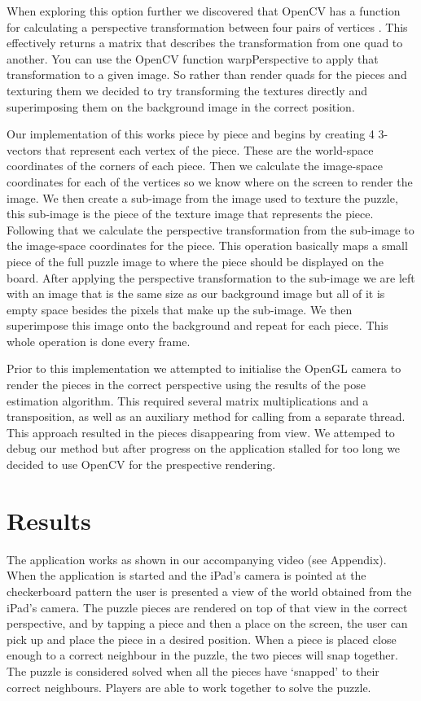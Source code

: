 \documentclass{article}
\begin{document}
When exploring this option further we discovered that OpenCV has a function for calculating a perspective transformation between four pairs of vertices \cite{cv_render}. This effectively returns a matrix that describes the transformation from one quad to another. You can use the OpenCV function warpPerspective to apply that transformation to a given image. So rather than render quads for the pieces and texturing them we decided to try transforming the textures directly and superimposing them on the background image in the correct position. 

Our implementation of this works piece by piece and begins by creating 4 3-vectors that represent each vertex of the piece. These are the world-space coordinates of the corners of each piece. Then we calculate the image-space coordinates for each of the vertices so we know where on the screen to render the image. We then create a sub-image from the image used to texture the puzzle, this sub-image is the piece of the texture image that represents the piece. Following that we calculate the perspective transformation from the sub-image to the image-space coordinates for the piece. This operation basically maps a small piece of the full puzzle image to where the piece should be displayed on the board. After applying the perspective transformation to the sub-image we are left with an image that is the same size as our background image but all of it is empty space besides the pixels that make up the sub-image. We then superimpose this image onto the background and repeat for each piece. This whole operation is done every frame. 

Prior to this implementation we attempted to initialise the OpenGL camera to render the pieces in the correct perspective using the results of the pose estimation algorithm. This required several matrix multiplications and a transposition, as well as an auxiliary method for calling from a separate thread. This approach resulted in the pieces disappearing from view. We attemped to debug our method but after progress on the application stalled for too long we decided to use OpenCV for the prespective rendering. 

\section{Results}

The application works as shown in our accompanying video (see Appendix). When the application is started and the iPad's camera is pointed at the checkerboard pattern the user is presented a view of the world obtained from the iPad's camera. The puzzle pieces are rendered on top of that view in the correct perspective, and by tapping a piece and then a place on the screen, the user can pick up and place the piece in a desired position. When a piece is placed close enough to a correct neighbour in the puzzle, the two pieces will snap together. The puzzle is considered solved when all the pieces have `snapped' to their correct neighbours. Players are able to work together to solve the puzzle. 
\end{document}
